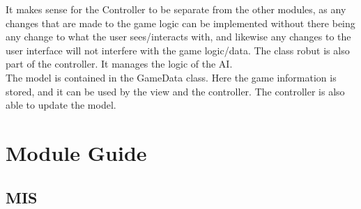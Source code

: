 \documentclass[12pt]{article}
\begin{document}
	It makes sense for the Controller to be separate from the other modules, as any changes that are made to the game logic can be implemented without there being any change to what the user sees/interacts with, and likewise any changes to the user interface will not interfere with the game logic/data. The class robut is also part of the controller. It manages the logic of the AI.
	\\	The model is contained in the GameData class. Here the game information is stored, and it can be used by the view and the controller. The controller is also able to update the model.
	\section{Module Guide}
	\subsection{MIS}
\end{document}
